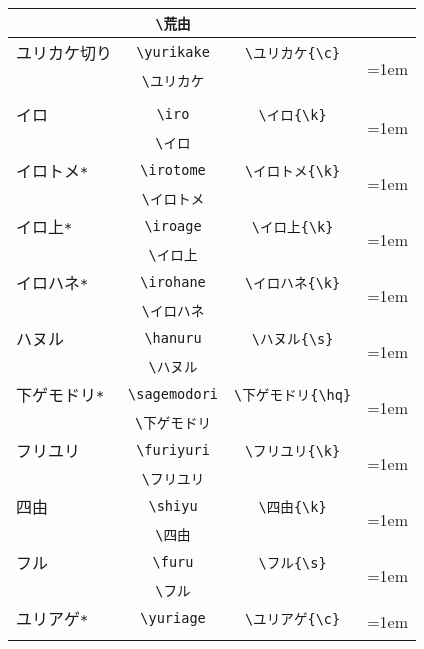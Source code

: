 \documentclass[a4paper,luatex]{l3doc}
\def\fu#1{%
{%
  \tanni=1em%
    \begin{tikzpicture}[x=\tanni,y=\tanni]%
     #1%
    \end{tikzpicture}%
}}%
\begin{document}
\begin{longtable}{|l|c|c|c|}
&\verb|\荒由|&&\\\hline
ユリカケ切り&\verb|\yurikake|&\verb|\ユリカケ{\c}|&\multirow{3}{*}{\fu{\ユリカケ{\c}}}\\\nopagebreak
&\verb|\ユリカケ|&&\\\nopagebreak
&&&\\\hline
イロ&\verb|\iro|&\verb|\イロ{\k}|&\multirow{2}{*}{\fu{\イロ{\k}}}\\\nopagebreak
&\verb|\イロ|&&\\\hline
イロトメ\verb|*|&\verb|\irotome|&\verb|\イロトメ{\k}|&\multirow{2}{*}{\fu{\イロトメ{\k}}}\\\nopagebreak
&\verb|\イロトメ|&&\\\hline
イロ上\verb|*|&\verb|\iroage|&\verb|\イロ上{\k}|&\multirow{2}{*}{\fu{\イロ上{\k}}}\\\nopagebreak
&\verb|\イロ上|&&\\\hline
イロハネ\verb|*|&\verb|\irohane|&\verb|\イロハネ{\k}|&\multirow{2}{*}{\fu{\イロハネ{\k}}}\\\nopagebreak&\verb|\イロハネ|&&\\\hline
ハヌル&\verb|\hanuru|&\verb|\ハヌル{\s}|&\multirow{2}{*}{\fu{\ハヌル{\s}}}\\\nopagebreak
&\verb|\ハヌル|&&\\\hline
下ゲモドリ\verb|*|&\verb|\sagemodori|&\verb|\下ゲモドリ{\hq}|&\multirow{2}{*}{\fu{\下ゲモドリ{\hq}}}\\\nopagebreak
&\verb|\下ゲモドリ|&&\\\hline
フリユリ&\verb|\furiyuri|&\verb|\フリユリ{\k}|&\multirow{2}{*}{\fu{\フリユリ{\k}}}\\\nopagebreak
&\verb|\フリユリ|&&\\\hline
四由&\verb|\shiyu|&\verb|\四由{\k}|&\multirow{2}{*}{\fu{\四由{\k}}}\\\nopagebreak
&\verb|\四由|&&\\\hline
フル&\verb|\furu|&\verb|\フル{\s}|&\multirow{2}{*}{\fu{\フル{\s}}}\\\nopagebreak
&\verb|\フル|&&\\\hline
ユリアゲ\verb|*|&\verb|\yuriage|&\verb|\ユリアゲ{\c}|&\multirow{2}{*}{\fu{\ユリアゲ{\c}}}\\\nopagebreak

\end{longtable}
\end{document}
